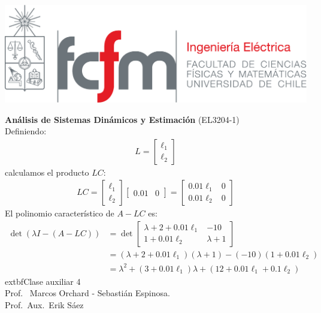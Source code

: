 \documentclass[
  11pt,
  letterpaper,
   addpoints,
   answers
  ]{exam}
\begin{document}
\pagestyle{headandfoot}
\firstpageheader{}{}{}
\runningheader{}{}{}
\firstpagefooter{}{\thepage}{}
\runningfooter{}{\thepage}{}

\noindent
\begin{minipage}{0.47\textwidth}
\includegraphics[width=\textwidth]{../fcfm_die}
\end{minipage}
\begin{minipage}{0.53\textwidth}
\begin{center}
\large\textbf{Análisis de Sistemas Dinámicos y Estimación} (EL3204-1) \\Definiendo:
\begin{align}
  L= \begin{bmatrix} \ell_1 \\ \ell_2 \end{bmatrix}
\end{align}
calculamos el producto $LC$:
\begin{align}
  LC = \begin{bmatrix} \ell_1 \\ \ell_2 \end{bmatrix} \begin{bmatrix} 0.01 & 0 \end{bmatrix} = \begin{bmatrix} 0.01\ell_1 & 0 \\ 0.01\ell_2 & 0 \end{bmatrix}
\end{align}
El polinomio característico de $A-LC$ es:
\begin{align}
  \det(\lambda I - (A-LC)) &= \det\begin{bmatrix} \lambda + 2 + 0.01\ell_1 & -10 \\ 1 + 0.01\ell_2 & \lambda + 1 \end{bmatrix} \\
  &= (\lambda + 2 + 0.01\ell_1)(\lambda + 1) - (-10)(1 + 0.01\ell_2) \\
  &= \lambda^2 + (3 + 0.01\ell_1)\lambda + (12 + 0.01\ell_1 + 0.1\ell_2)
\end{align}extbf{Clase auxiliar 4} \\
\normalsize Prof.~ Marcos Orchard - Sebastián Espinosa.\\
\normalsize Prof.~Aux.~Erik Sáez
\end{center}
\end{minipage}
\end{document}
